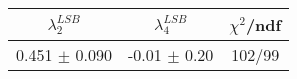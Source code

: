 \begin{tabular}{c|c||c}
$\lambda_{2}^{LSB}$ & $\lambda_4^{LSB}$ & $\chi^{2}$/ndf \\
\hline
0.451 $\pm$ 0.090 & -0.01 $\pm$ 0.20 & 102/99\\
\end{tabular}
